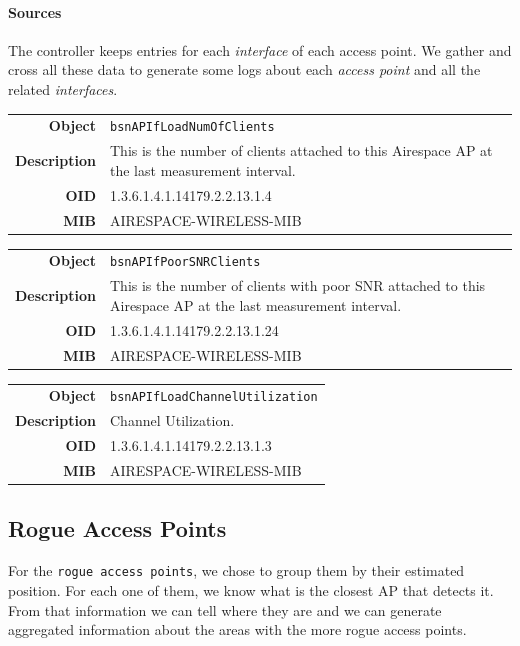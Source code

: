 \paragraph*{Sources} The controller keeps entries for each \emph{interface} of each access point. We gather and cross all these data to generate some logs about each \emph{access point} and all the related \emph{interfaces}.

\begin{tabular}{|r l|}
\hline
\textbf{Object} & \texttt{bsnAPIfLoadNumOfClients} \\
\textbf{Description} & \parbox{11cm}{This is the number of clients attached to this Airespace AP at the last measurement interval.} \\
\textbf{OID} & 1.3.6.1.4.1.14179.2.2.13.1.4 \\
\textbf{MIB} & AIRESPACE-WIRELESS-MIB \\
\hline
\end{tabular}

\begin{tabular}{|r l|}
\hline
\textbf{Object} & \texttt{bsnAPIfPoorSNRClients} \\
\textbf{Description} & \parbox{11cm}{This is the number of clients with poor SNR attached to this Airespace AP at the last measurement interval.} \\
\textbf{OID} & 1.3.6.1.4.1.14179.2.2.13.1.24 \\
\textbf{MIB} & AIRESPACE-WIRELESS-MIB \\
\hline
\end{tabular}

\begin{tabular}{|r l|}
\hline
\textbf{Object} & \texttt{bsnAPIfLoadChannelUtilization} \\
\textbf{Description} & \parbox{11cm}{Channel Utilization.} \\
\textbf{OID} & 1.3.6.1.4.1.14179.2.2.13.1.3 \\
\textbf{MIB} & AIRESPACE-WIRELESS-MIB \\
\hline
\end{tabular}

\subsection{Rogue Access Points}
For the \texttt{rogue access points}, we chose to group them by their estimated position. For each one of them, we know what is the closest AP that detects it. From that information we can tell where they are and we can generate aggregated information about the areas with the more rogue access points.

